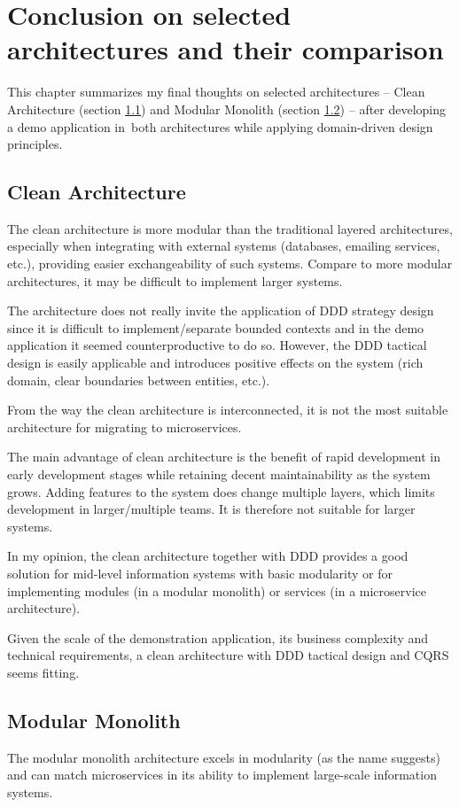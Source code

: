 \chapter{Conclusion on selected architectures and their comparison}
\label{chapter_comparison}
This chapter summarizes my final thoughts on selected architectures -- Clean Architecture (section \ref{con:ca}) and Modular Monolith (section \ref{con:mm}) -- after developing a demo application in~both architectures while applying domain-driven design principles.

\section{Clean Architecture}
\label{con:ca}
The clean architecture is more modular than the traditional layered architectures, especially when integrating with external systems (databases, emailing services, etc.), providing easier exchangeability of such systems. Compare to more modular architectures, it may be difficult to implement larger systems.

The architecture does not really invite the application of DDD strategy design since it is difficult to implement/separate bounded contexts and in the demo application it seemed counterproductive to do so. However, the DDD tactical design is easily applicable and introduces positive effects on the system (rich domain, clear boundaries between entities, etc.).

From the way the clean architecture is interconnected, it is not the most suitable architecture for migrating to microservices.

The main advantage of clean architecture is the benefit of rapid development in early development stages while retaining decent maintainability as the system grows. Adding features to the system does change multiple layers, which limits development in larger/multiple teams. It is therefore not suitable for larger systems. 

In my opinion, the clean architecture together with DDD provides a good solution for mid-level information systems with basic modularity or for implementing modules (in a modular monolith) or services (in a microservice architecture). 

Given the scale of the demonstration application, its business complexity and technical requirements, a clean architecture with DDD tactical design and CQRS seems fitting.

\section{Modular Monolith}
\label{con:mm}
The modular monolith architecture excels in modularity (as the name suggests) and can match microservices in its ability to implement large-scale information systems.

